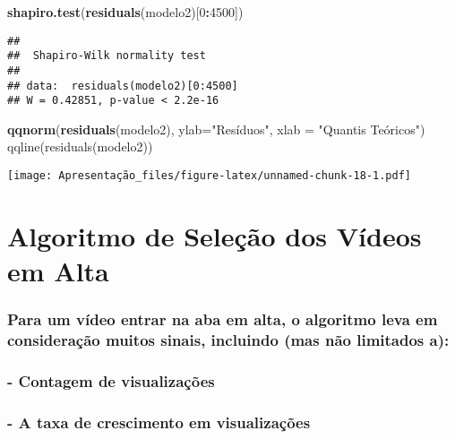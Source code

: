 \documentclass[]{article}
\newenvironment{Shaded}{\begin{snugshade}}{\end{snugshade}}
\newcommand{\DataTypeTok}[1]{\textcolor[rgb]{0.13,0.29,0.53}{#1}}
\newcommand{\DecValTok}[1]{\textcolor[rgb]{0.00,0.00,0.81}{#1}}
\newcommand{\KeywordTok}[1]{\textcolor[rgb]{0.13,0.29,0.53}{\textbf{#1}}}
\newcommand{\NormalTok}[1]{#1}
\newcommand{\OperatorTok}[1]{\textcolor[rgb]{0.81,0.36,0.00}{\textbf{#1}}}
\newcommand{\StringTok}[1]{\textcolor[rgb]{0.31,0.60,0.02}{#1}}
\begin{document}
\begin{Shaded}
\begin{Highlighting}[]
  \KeywordTok{shapiro.test}\NormalTok{(}\KeywordTok{residuals}\NormalTok{(modelo2)[}\DecValTok{0}\OperatorTok{:}\DecValTok{4500}\NormalTok{])}
\end{Highlighting}
\end{Shaded}

\begin{verbatim}
## 
##  Shapiro-Wilk normality test
## 
## data:  residuals(modelo2)[0:4500]
## W = 0.42851, p-value < 2.2e-16
\end{verbatim}

\begin{Shaded}
\begin{Highlighting}[]
  \KeywordTok{qqnorm}\NormalTok{(}\KeywordTok{residuals}\NormalTok{(modelo2), }\DataTypeTok{ylab=}\StringTok{"Resíduos"}\NormalTok{, }\DataTypeTok{xlab =} \StringTok{"Quantis Teóricos")}
\StringTok{  qqline(residuals(modelo2))}
\end{Highlighting}
\end{Shaded}

\texttt{[image: Apresentação\_files/figure-latex/unnamed-chunk-18-1.pdf]}

\hypertarget{algoritmo-de-selecao-dos-videos-em-alta}{%
\section{Algoritmo de Seleção dos Vídeos em
Alta}\label{algoritmo-de-selecao-dos-videos-em-alta}}

\hypertarget{para-um-video-entrar-na-aba-em-alta-o-algoritmo-leva-em-consideracao-muitos-sinais-incluindo-mas-nao-limitados-a}{%
\subsubsection{Para um vídeo entrar na aba em alta, o algoritmo leva em
consideração muitos sinais, incluindo (mas não limitados
a):}\label{para-um-video-entrar-na-aba-em-alta-o-algoritmo-leva-em-consideracao-muitos-sinais-incluindo-mas-nao-limitados-a}}

\hypertarget{contagem-de-visualizacoes}{%
\subsubsection{- Contagem de
visualizações}\label{contagem-de-visualizacoes}}

\hypertarget{a-taxa-de-crescimento-em-visualizacoes}{%
\subsubsection{- A taxa de crescimento em
visualizações}\label{a-taxa-de-crescimento-em-visualizacoes}}
\end{document}
